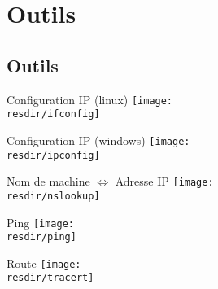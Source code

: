 \def\resdir{outils}

\section{Outils}

\subsection{Outils}

\begin{frame}{Configuration IP (linux)}
	\centering
	\texttt{[image: \\resdir/ifconfig]}
	
\end{frame}

\begin{frame}{Configuration IP (windows)}
	\centering
	\texttt{[image: \\resdir/ipconfig]}
	
\end{frame}

\begin{frame}{Nom de machine $\Longleftrightarrow$ Adresse IP}
	\centering
	\texttt{[image: \\resdir/nslookup]}
	
\end{frame}

\begin{frame}{Ping}
	\centering
	\texttt{[image: \\resdir/ping]}
	
\end{frame}

\begin{frame}{Route}
	\centering
	\texttt{[image: \\resdir/tracert]}
	
\end{frame}
